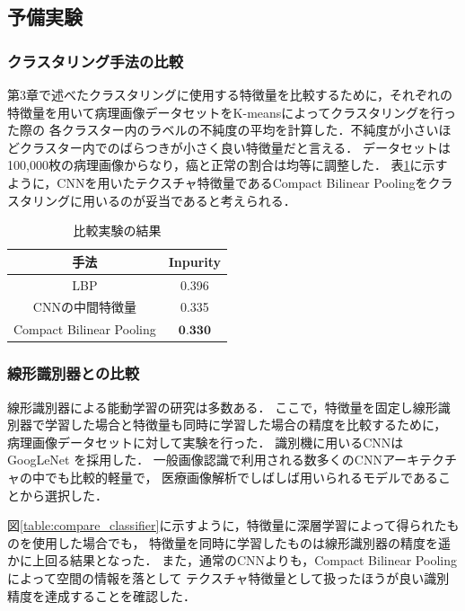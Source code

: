 \subsection{予備実験}

\subsubsection{クラスタリング手法の比較}
第3章で述べたクラスタリングに使用する特徴量を比較するために，それぞれの特徴量を用いて病理画像データセットをK-meansによってクラスタリングを行った際の
各クラスター内のラベルの不純度の平均を計算した．不純度が小さいほどクラスター内でのばらつきが小さく良い特徴量だと言える．
データセットは100,000枚の病理画像からなり，癌と正常の割合は均等に調整した．
表\ref{table:compare_feat}に示すように，CNNを用いたテクスチャ特徴量であるCompact Bilinear Poolingをクラスタリングに用いるのが妥当であると考えられる．

\begin{table}[h]
  \caption{\label{table:compare_feat}比較実験の結果}
  \center
  \begin{tabular}{c|c} \hline
     手法 & Inpurity \\ \hline
    LBP & 0.396 \\
    CNNの中間特徴量 & 0.335  \\ 
    Compact Bilinear Pooling & $\textbf{0.330}$ \\ \hline
  \end{tabular}
\end{table}

\subsubsection{線形識別器との比較}
線形識別器による能動学習の研究は多数ある．
ここで，特徴量を固定し線形識別器で学習した場合と特徴量も同時に学習した場合の精度を比較するために，
病理画像データセットに対して実験を行った．
識別機に用いるCNNはGoogLeNet \cite{szegedy2015going}を採用した．
一般画像認識で利用される数多くのCNNアーキテクチャの中でも比較的軽量で，
医療画像解析でしばしば用いられるモデルであることから選択した．

図\ref{table:compare_classifier}に示すように，特徴量に深層学習によって得られたものを使用した場合でも，
特徴量を同時に学習したものは線形識別器の精度を遥かに上回る結果となった．
また，通常のCNNよりも，Compact Bilinear Poolingによって空間の情報を落として
テクスチャ特徴量として扱ったほうが良い識別精度を達成することを確認した．

